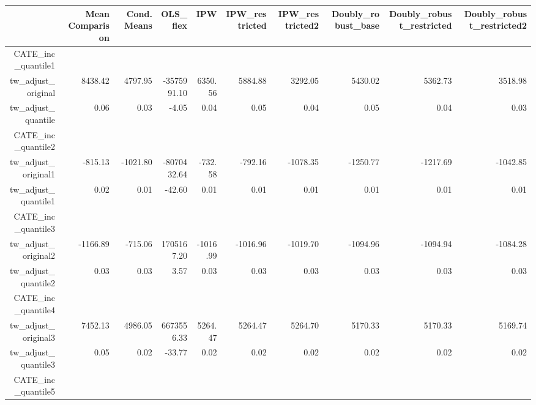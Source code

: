 \begin{table}[ht]
\centering
\begin{tabular}{rrrrrrrrrr}
  \hline
 & Mean Comparison & Cond. Means & OLS\_flex & IPW & IPW\_restricted & IPW\_restricted2 & Doubly\_robust\_base & Doubly\_robust\_restricted & Doubly\_robust\_restricted2 \\ 
  \hline
CATE\_inc\_quantile1 &  &  &  &  &  &  &  &  &  \\ 
  tw\_adjust\_original & 8438.42 & 4797.95 & -3575991.10 & 6350.56 & 5884.88 & 3292.05 & 5430.02 & 5362.73 & 3518.98 \\ 
  tw\_adjust\_quantile & 0.06 & 0.03 & -4.05 & 0.04 & 0.05 & 0.04 & 0.05 & 0.04 & 0.03 \\ 
  CATE\_inc\_quantile2 &  &  &  &  &  &  &  &  &  \\ 
  tw\_adjust\_original1 & -815.13 & -1021.80 & -8070432.64 & -732.58 & -792.16 & -1078.35 & -1250.77 & -1217.69 & -1042.85 \\ 
  tw\_adjust\_quantile1 & 0.02 & 0.01 & -42.60 & 0.01 & 0.01 & 0.01 & 0.01 & 0.01 & 0.01 \\ 
  CATE\_inc\_quantile3 &  &  &  &  &  &  &  &  &  \\ 
  tw\_adjust\_original2 & -1166.89 & -715.06 & 1705167.20 & -1016.99 & -1016.96 & -1019.70 & -1094.96 & -1094.94 & -1084.28 \\ 
  tw\_adjust\_quantile2 & 0.03 & 0.03 & 3.57 & 0.03 & 0.03 & 0.03 & 0.03 & 0.03 & 0.03 \\ 
  CATE\_inc\_quantile4 &  &  &  &  &  &  &  &  &  \\ 
  tw\_adjust\_original3 & 7452.13 & 4986.05 & 6673556.33 & 5264.47 & 5264.47 & 5264.70 & 5170.33 & 5170.33 & 5169.74 \\ 
  tw\_adjust\_quantile3 & 0.05 & 0.02 & -33.77 & 0.02 & 0.02 & 0.02 & 0.02 & 0.02 & 0.02 \\ 
  CATE\_inc\_quantile5 &  &  &  &  &  &  &  &  &  \\ 
   \hline
\end{tabular}
\end{table}
